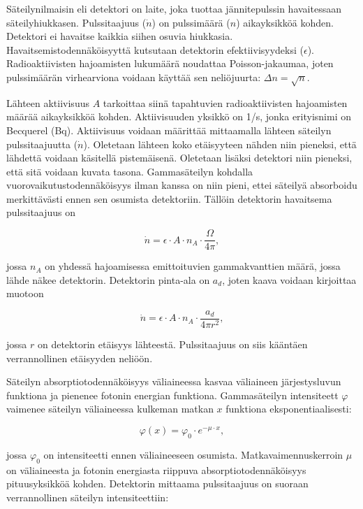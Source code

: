 \documentclass[a4paper,11pt]{article}
\begin{document}
Säteilynilmaisin eli detektori on laite, joka tuottaa jännitepulssin havaitessaan säteilyhiukkasen. Pulssitaajuus ($\dot{n}$) on pulssimäärä ($n$) aikayksikköä kohden. Detektori ei havaitse kaikkia siihen osuvia hiukkasia. Havaitsemistodennäköisyyttä kutsutaan detektorin efektiivisyydeksi ($\epsilon$). Radioaktiivisten hajoamisten lukumäärä noudattaa Poisson-jakaumaa, joten pulssimäärän virhearviona voidaan käyttää sen neliöjuurta: $\Delta n = \sqrt{n}$.

Lähteen aktiivisuus $A$ tarkoittaa siinä tapahtuvien radioaktiivisten hajoamisten määrää aikayksikköä kohden. Aktiivisuuden yksikkö on 1/s, jonka erityisnimi on Becquerel (Bq). Aktiivisuus voidaan määrittää mittaamalla lähteen säteilyn pulssitaajuutta ($\dot{n}$). Oletetaan lähteen koko etäisyyteen nähden niin pieneksi, että lähdettä voidaan käsitellä pistemäisenä. Oletetaan lisäksi detektori niin pieneksi, että sitä voidaan kuvata tasona. Gammasäteilyn kohdalla vuorovaikutustodennäköisyys ilman kanssa on niin pieni, ettei säteilyä absorboidu merkittävästi ennen sen osumista detektoriin. Tällöin detektorin havaitsema pulssitaajuus on 

\begin{equation}
  \dot{n} = \epsilon \cdot A \cdot n_A \cdot \frac{\Omega}{4 \pi} ,
\end{equation}

jossa $n_A$ on yhdessä hajoamisessa emittoituvien gammakvanttien määrä, jossa lähde näkee detektorin. Detektorin pinta-ala on $a_d$, joten kaava voidaan kirjoittaa muotoon

\begin{equation}
  \label{pulssitaajuus}
  \dot{n} = \epsilon \cdot A \cdot n_A \cdot \frac{a_d}{4 \pi r^2} ,
\end{equation}

jossa $r$ on detektorin etäisyys lähteestä. Pulssitaajuus on siis kääntäen verrannollinen etäisyyden neliöön. 

Säteilyn absorptiotodennäköisyys väliaineessa kasvaa väliaineen järjestysluvun funktiona ja pienenee fotonin energian funktiona. Gammasäteilyn intensiteett $\varphi$ vaimenee säteilyn väliaineessa kulkeman matkan $x$ funktiona eksponentiaalisesti:

\begin{equation}
  \varphi(x) = \varphi_0 \cdot e^{-\mu \cdot x} ,
\end{equation}

jossa $\varphi_0$ on intensiteetti ennen väliaineeseen osumista. Matkavaimennuskerroin $\mu$ on väliaineesta ja fotonin energiasta riippuva absorptiotodennäköisyys pituusyksikköä kohden. Detektorin mittaama pulssitaajuus on suoraan verrannollinen säteilyn intensiteettiin: 
\end{document}
